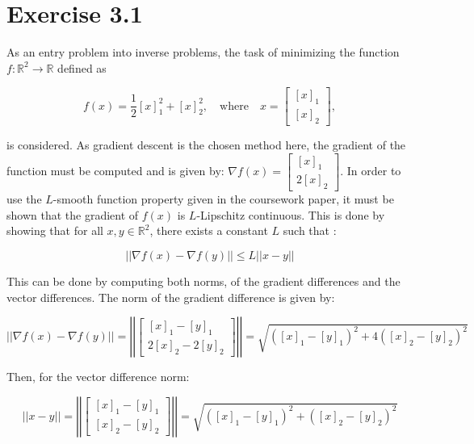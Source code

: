 \documentclass[12pt]{report} %
\begin{document}
\section{Exercise 3.1}

As an entry problem into inverse problems, the task of minimizing the function \(f: \mathbb{R}^2 \to \mathbb{R}\) defined as

\begin{equation}
f(x) = \frac{1}{2} [x]_1^2 + [x]_2^2, \quad \text{where} \quad x = \begin{bmatrix} [x]_1 \\ [x]_2 \end{bmatrix},
\end{equation}

is considered. As gradient descent is the chosen method here, the gradient of the function must be computed and is given by: $\nabla f(x) = \begin{bmatrix} [x]_1 \\ 2[x]_2 \end{bmatrix}$. In order to use the $L$-smooth function property given in the coursework paper, it must be shown that the gradient of $f(x)$ is $L$-Lipschitz continuous. This is done by showing that for all $x, y \in \mathbb{R}^2$, there exists a constant $L$ such that \cite{lecture3}:

\begin{equation}
    ||\nabla f(x) - \nabla f(y)|| \leq L||x - y||
\end{equation}

This can be done by computing both norms, of the gradient differences and the vector differences. The norm of the gradient difference is given by:

\begin{equation}
    ||\nabla f(x) - \nabla f(y)|| = \left|\left| \begin{bmatrix} [x]_1 - [y]_1 \\ 2[x]_2 - 2[y]_2 \end{bmatrix} \right|\right| = \sqrt{([x]_1 - [y]_1)^2 + 4([x]_2 - [y]_2)^2}
\end{equation}

Then, for the vector difference norm:

\begin{equation}
    ||x - y|| = \left|\left| \begin{bmatrix} [x]_1 - [y]_1 \\ [x]_2 - [y]_2 \end{bmatrix} \right|\right| = \sqrt{([x]_1 - [y]_1)^2 + ([x]_2 - [y]_2)^2}
\end{equation}
\end{document}
